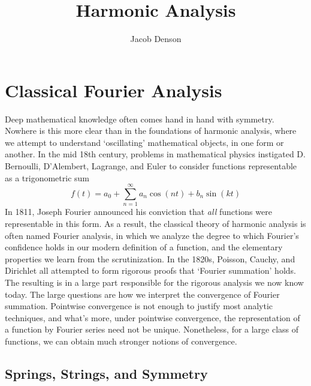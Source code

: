 

\DeclareMathOperator{\Dom}{Dom}

\title{Harmonic Analysis}
\author{Jacob Denson}




\maketitle

\tableofcontents


\part{Classical Fourier Analysis}

Deep mathematical knowledge often comes hand in hand with symmetry. Nowhere is this more clear than in the foundations of harmonic analysis, where we attempt to understand `oscillating' mathematical objects, in one form or another. In the mid 18th century, problems in mathematical physics instigated D. Bernoulli, D'Alembert, Lagrange, and Euler to consider functions representable as a trigonometric sum
%
\[ f(t) = a_0 + \sum_{n = 1}^\infty a_n \cos(nt) + b_n \sin(kt) \]
%
In 1811, Joseph Fourier announced his conviction that {\it all} functions were representable in this form. As a result, the classical theory of harmonic analysis is often named Fourier analysis, in which we analyze the degree to which Fourier's confidence holds in our modern definition of a function, and the elementary properties we learn from the scrutinization. In the 1820s, Poisson, Cauchy, and Dirichlet all attempted to form rigorous proofs that `Fourier summation' holds. The resulting  is in a large part responsible for the rigorous analysis we now know today. The large questions are how we interpret the convergence of Fourier summation. Pointwise convergence is not enough to justify most analytic techniques, and what's more, under pointwise convergence, the representation of a function by Fourier series need not be unique. Nonetheless, for a large class of functions, we can obtain much stronger notions of convergence.

\chapter{Springs, Strings, and Symmetry}

